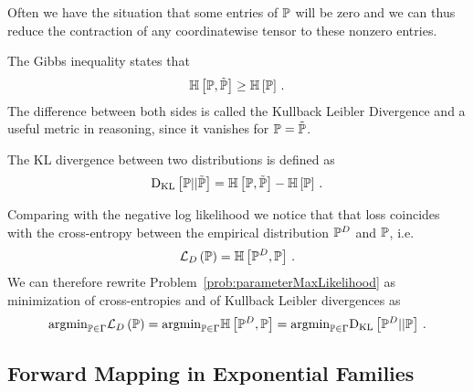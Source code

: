 Often we have the situation that some entries of $\mathbb{P}$ will be zero and we can thus reduce the contraction of any coordinatewise tensor to these nonzero entries. 

The Gibbs inequality states that
		\[ \mathbb{H}\left[\mathbb{P},\tilde{\mathbb{P}}\right] \geq \mathbb{H}\left[\mathbb{P}\right] \, . \]
The difference between both sides is called the Kullback Leibler Divergence and a useful metric in reasoning, since it vanishes for $\mathbb{P}=\tilde{\mathbb{P}}$.

\begin{definition}\label{def:KLDivergence}
	The KL divergence between two distributions is defined as 
		\[ \mathrm{D}_{\mathrm{KL}}\left[ \mathbb{P} || \tilde{\mathbb{P}} \right] = \mathbb{H}\left[\mathbb{P},\tilde{\mathbb{P}}\right] - \mathbb{H}\left[\mathbb{P}\right]  \, . \]
%		
\end{definition}



Comparing with the negative log likelihood we notice that that loss coincides with the cross-entropy between the empirical distribution $\mathbb{P}^{D}$ and $\mathbb{P}$, i.e.
	\[ \mathcal{L}_{D}\left(\mathbb{P}\right) = \mathbb{H}\left[\mathbb{P}^{D},\mathbb{P}\right] \, . \]
We can therefore rewrite Problem~\ref{prob:parameterMaxLikelihood} as minimization of cross-entropies and of Kullback Leibler divergences as
\begin{align*}
	\mathrm{argmin}_{\mathbb{P}\in\Gamma} \mathcal{L}_{D}\left(\mathbb{P}\right) 
	= \mathrm{argmin}_{\mathbb{P}\in\Gamma} \mathbb{H}\left[\mathbb{P}^{D},\mathbb{P}\right] 
	= \mathrm{argmin}_{\mathbb{P}\in\Gamma} \mathrm{D}_{\mathrm{KL}}\left[ \mathbb{P}^{D} || \mathbb{P} \right] \, .
\end{align*}
	








\subsection{Forward Mapping in Exponential Families} 


